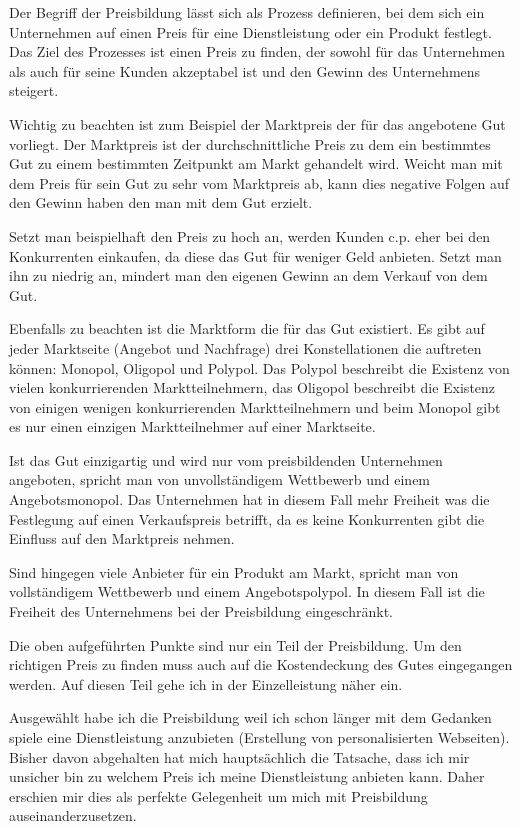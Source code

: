 \begin{refsection}
  
  Der Begriff der Preisbildung lässt sich als Prozess definieren, bei dem sich ein Unternehmen auf einen Preis für eine Dienstleistung oder ein Produkt festlegt. Das Ziel des Prozesses ist einen Preis zu finden, der sowohl für das Unternehmen als auch für seine Kunden akzeptabel ist und den Gewinn des Unternehmens steigert. 

  Wichtig zu beachten ist zum Beispiel der Marktpreis der für das angebotene Gut vorliegt. Der Marktpreis ist der durchschnittliche Preis zu dem ein bestimmtes Gut zu einem bestimmten Zeitpunkt am Markt gehandelt wird. Weicht man mit dem Preis für sein Gut zu sehr vom Marktpreis ab, kann dies negative Folgen auf den Gewinn haben den man mit dem Gut erzielt.\autocite[142]{Schinnerl2021}

  Setzt man beispielhaft den Preis zu hoch an, werden Kunden c.p. eher bei den Konkurrenten einkaufen, da diese das Gut für weniger Geld anbieten. Setzt man ihn zu niedrig an, mindert man den eigenen Gewinn an dem Verkauf von dem Gut.

  Ebenfalls zu beachten ist die Marktform die für das Gut existiert. Es gibt auf jeder Marktseite (Angebot und Nachfrage) drei Konstellationen die auftreten können: Monopol, Oligopol und Polypol. Das Polypol beschreibt die Existenz von vielen konkurrierenden Marktteilnehmern, das Oligopol beschreibt die Existenz von einigen wenigen konkurrierenden Marktteilnehmern und beim Monopol gibt es nur einen einzigen Marktteilnehmer auf einer Marktseite.

  Ist das Gut einzigartig und wird nur vom preisbildenden Unternehmen angeboten, spricht man von unvollständigem Wettbewerb und einem Angebotsmonopol. Das Unternehmen hat in diesem Fall mehr Freiheit was die Festlegung auf einen Verkaufspreis betrifft, da es keine Konkurrenten gibt die Einfluss auf den Marktpreis nehmen.

  Sind hingegen viele Anbieter für ein Produkt am Markt, spricht man von vollständigem Wettbewerb und einem Angebotspolypol. In diesem Fall ist die Freiheit des Unternehmens bei der Preisbildung eingeschränkt.

  Die oben aufgeführten Punkte sind nur ein Teil der Preisbildung. Um den richtigen Preis zu finden muss auch auf die Kostendeckung des Gutes eingegangen werden. Auf diesen Teil gehe ich in der Einzelleistung näher ein.

  Ausgewählt habe ich die Preisbildung weil ich schon länger mit dem Gedanken spiele eine Dienstleistung anzubieten (Erstellung von personalisierten Webseiten). Bisher davon abgehalten hat mich hauptsächlich die Tatsache, dass ich mir unsicher bin zu welchem Preis ich meine Dienstleistung anbieten kann. Daher erschien mir dies als perfekte Gelegenheit um mich mit Preisbildung auseinanderzusetzen.
  \clearpage
  \printbibliography[heading=subsubbibliography]
\end{refsection}
\clearpage
